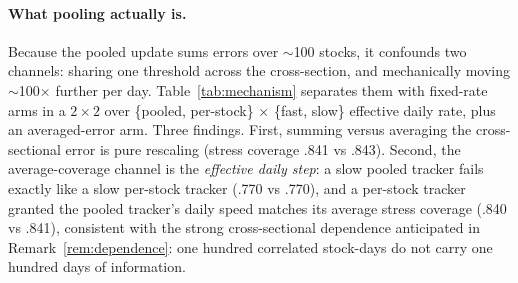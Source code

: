 \paragraph{What pooling actually is.} Because the pooled update sums
errors over $\sim$100 stocks, it confounds two channels: sharing one
threshold across the cross-section, and mechanically moving
$\sim$100$\times$ further per day. Table~\ref{tab:mechanism} separates
them with fixed-rate arms in a $2 \times 2$ over \{pooled, per-stock\}
$\times$ \{fast, slow\} effective daily rate, plus an averaged-error
arm. Three findings. First, summing versus averaging the cross-sectional
error is pure rescaling (stress coverage .841 vs .843). Second, the
average-coverage channel is the \emph{effective daily step}: a slow
pooled tracker fails exactly like a slow per-stock tracker (.770 vs
.770), and a per-stock tracker granted the pooled tracker's daily speed
matches its average stress coverage (.840 vs .841), consistent with the
strong cross-sectional dependence anticipated in
Remark~\ref{rem:dependence}: one hundred correlated stock-days do not
carry one hundred days of information.

